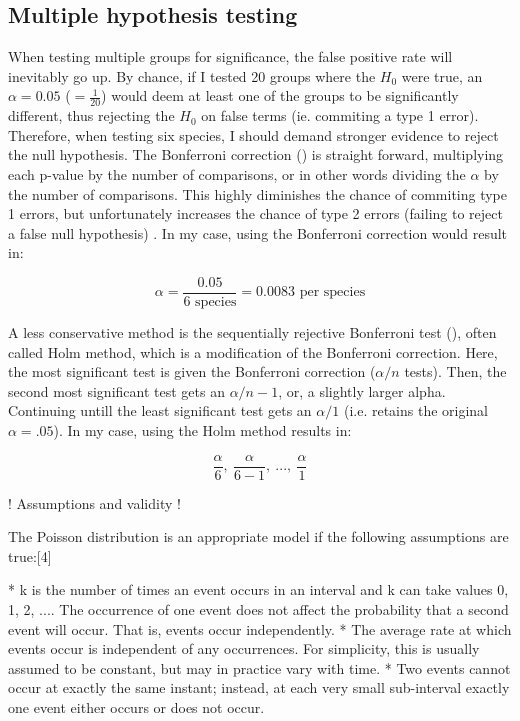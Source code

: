 \subsection*{Multiple hypothesis testing}
When testing multiple groups for significance, the false positive rate will inevitably go up. 
By chance, if I tested 20 groups where the $H_{0}$ were true, an $\alpha = 0.05$ 
($ =  \frac{1}{20} $) 
would deem at least one of the groups to be significantly different, thus rejecting the $H_{0}$ on false terms (ie. commiting a type 1 error).
Therefore, when testing six species, I should demand stronger evidence to reject the null hypothesis.
The Bonferroni correction (\cite{Holm1979}) is straight forward, multiplying each p-value by the number of comparisons, or in other words dividing the $\alpha$ by the number of comparisons. This highly diminishes the chance of commiting type 1 errors, but unfortunately increases the chance of type 2 errors (failing to reject a false null hypothesis) \cite{Shaffer1995}. 
In my case, using the Bonferroni correction would result in:

 $$ \alpha = \frac{0.05}{ 6 \mbox{\ species} } = 0.0083 \mbox{\ per species} $$ 


A less conservative method is the sequentially rejective Bonferroni test (\cite{Holm1979}), often called Holm method, which is a modification of the Bonferroni correction. Here, the most significant test is given the Bonferroni correction ($\alpha /n$ tests).
Then, the second most significant test gets an $\alpha / n - 1$, or, a slightly larger alpha.
Continuing untill the least significant test gets an $\alpha / 1$ (i.e. retains the original $\alpha = .05$). In my case, using the Holm method results in:

 $$ \frac{\alpha}{6},\ \frac{\alpha}{6-1},\ ...,\ \frac{\alpha}{1} $$
 
 
 
! Assumptions and validity !

The Poisson distribution is an appropriate model if the following assumptions are true:[4]

*    k is the number of times an event occurs in an interval and k can take values 0, 1, 2, ....
    The occurrence of one event does not affect the probability that a second event will occur. That is, events occur independently.
*    The average rate at which events occur is independent of any occurrences. For simplicity, this is usually assumed to be constant, but may in practice vary with time.
*    Two events cannot occur at exactly the same instant; instead, at each very small sub-interval exactly one event either occurs or does not occur.

